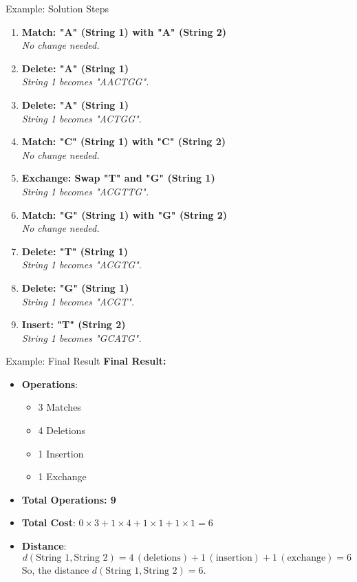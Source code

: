 \begin{frame}{Example: Solution Steps}
    \small
    \begin{enumerate}
        \item \textbf{Match: "A" (String 1) with "A" (String 2)}\\
              \textit{No change needed.}
        \item \textbf{Delete: "A" (String 1)}\\
              \textit{String 1 becomes "AACTGG".}
        \item \textbf{Delete: "A" (String 1)}\\
              \textit{String 1 becomes "ACTGG".}
        \item \textbf{Match: "C" (String 1) with "C" (String 2)}\\
              \textit{No change needed.}
        \item \textbf{Exchange: Swap "T" and "G" (String 1)}\\
              \textit{String 1 becomes "ACGTTG".}
        \item \textbf{Match: "G" (String 1) with "G" (String 2)}\\
              \textit{No change needed.}
        \item \textbf{Delete: "T" (String 1)}\\
              \textit{String 1 becomes "ACGTG".}
        \item \textbf{Delete: "G" (String 1)}\\
              \textit{String 1 becomes "ACGT".}
        \item \textbf{Insert: "T" (String 2)}\\
              \textit{String 1 becomes "GCATG".}
    \end{enumerate}
\end{frame}
\begin{frame}{Example: Final Result}
    \small
    \textbf{Final Result:}\\
    \begin{itemize}
        \item \textbf{Operations}:
        \begin{itemize}
            \item 3 Matches
            \item 4 Deletions
            \item 1 Insertion
            \item 1 Exchange
        \end{itemize}
        \item \textbf{Total Operations: 9}
        \item \textbf{Total Cost}: \( 0 \times 3 + 1 \times 4 + 1 \times 1 + 1 \times 1 = 6 \)
        \item \textbf{Distance}: 
              \[
              d(\text{String 1}, \text{String 2}) = 4 \, (\text{deletions}) + 1 \, (\text{insertion}) + 1 \, (\text{exchange}) = 6
              \]
              So, the distance \( d(\text{String 1}, \text{String 2}) = 6 \).
    \end{itemize}
\end{frame}